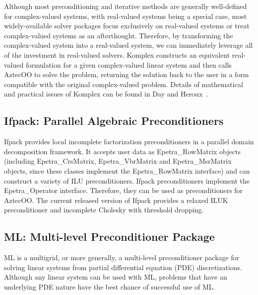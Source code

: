 \documentclass[acmtoms,acmnow]{acmtrans2m}
\begin{document}
Although most preconditioning and iterative methods are generally 
well-defined for complex-valued systems, with real-valued systems 
being a special case, most widely-available solver packages focus 
exclusively on real-valued systems or treat complex-valued systems 
as an afterthought.  Therefore, by transforming the complex-valued 
system into a real-valued system, we can immediately leverage all 
of the investment in real-valued solvers.  Komplex constructs an 
equivalent real-valued formulation for a given complex-valued linear 
system and then calls AztecOO to solve the problem, returning the 
solution back to the user in a form compatible with the original 
complex-valued problem.  Details of mathematical and practical 
issues of Komplex can be found in Day and Heroux~\cite{DayHero2001}.

\subsection{Ifpack: Parallel Algebraic Preconditioners}

Ifpack provides local incomplete factorization preconditioners in a
parallel domain decomposition framework.  It accepts user data as 
Epetra\_RowMatrix objects (including Epetra\_CrsMatrix, 
Epetra\_VbrMatrix and Epetra\_MsrMatrix objects, since these
classes implement the Epetra\_RowMatrix interface)
and can construct a variety of ILU preconditioners.  Ifpack 
preconditioners implement the Epetra\_Operator interface.  Therefore, 
they can be used as preconditioners for AztecOO.  The current 
released version of Ifpack provides a relaxed ILUK preconditioner and
incomplete Cholesky with threshold dropping.

\subsection{ML: Multi-level Preconditioner Package}

ML is a multigrid, or more generally, a multi-level preconditioner package for
solving linear systems
from partial differential equation (PDE) discretizations.
Although any linear system can be used with ML,
problems that have an underlying PDE nature have the best chance of successful
use of ML.
\end{document}
